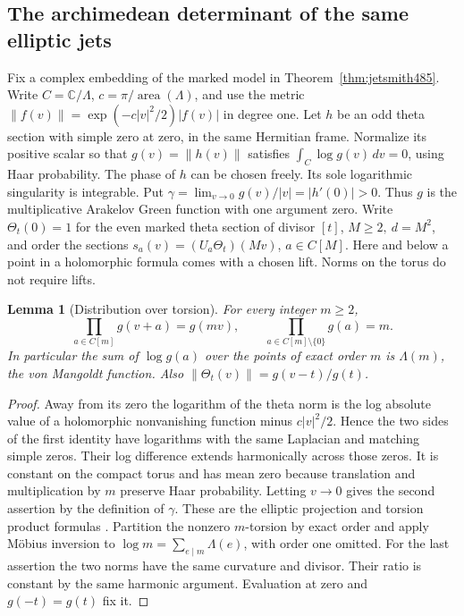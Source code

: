 \documentclass[a4paper,11pt]{article}
\newtheorem{lemma}[proposition]{Lemma}
\theoremstyle{definition}
\theoremstyle{remark}
\numberwithin{equation}{section}
\begin{document}
\subsection{The archimedean determinant of the same elliptic jets}
\label{sec:thetaalternant486}

Fix a complex embedding of the marked model in
Theorem~\ref{thm:jetsmith485}. Write \(C=\mathbb C/\Lambda\),
\(c=\pi/\operatorname{area}(\Lambda)\), and use the metric
\(\|f(v)\|=\exp(-c|v|^2/2)|f(v)|\) in degree one.
Let \(h\) be an odd theta section with simple zero at zero,
in the same Hermitian frame. Normalize its positive scalar
so that \(g(v)=\|h(v)\|\) satisfies
\(\int_C\log g(v)\,dv=0\), using Haar probability. The phase
of \(h\) can be chosen freely. Its sole logarithmic singularity
is integrable. Put
\(\gamma=\lim_{v\to0}g(v)/|v|=|h'(0)|>0\).
Thus \(g\) is the multiplicative Arakelov Green function with
one argument zero. Write \(\Theta_t(0)=1\) for the even marked
theta section of divisor \([t]\), \(M\ge2,\ d=M^2\), and order
the sections \(s_a(v)=(U_a\Theta_t)(Mv)\), \(a\in C[M]\).
Here and below a point in a holomorphic formula comes with a
chosen lift. Norms on the torus do not require lifts.

\begin{lemma}[Distribution over torsion]\leavevmode
\label{lem:green486}
For every integer \(m\ge2\),
\[
  \prod_{a\in C[m]}g(v+a)=g(mv),\qquad
  \prod_{a\in C[m]\setminus\{0\}}g(a)=m .
\]
In particular the sum of \(\log g(a)\) over the points of exact
order \(m\) is \(\Lambda(m)\), the von Mangoldt function.
Also \(\|\Theta_t(v)\|=g(v-t)/g(t)\).
\end{lemma}
\begin{proof}
Away from its zero the logarithm of the theta norm is the log
absolute value of a holomorphic nonvanishing function minus
\(c|v|^2/2\). Hence the two sides of the first identity have
logarithms with the same Laplacian and matching simple zeros.
Their log difference extends harmonically across those zeros.
It is constant on the compact torus and has mean zero because
translation and multiplication by \(m\) preserve Haar probability.
Letting \(v\to0\) gives the second assertion by the definition of
\(\gamma\). These are the elliptic projection and torsion product
formulas \cite[Thm.~3.2, Cor.~4.5]{XIII-X-dejong486}. Partition the
nonzero \(m\)-torsion by exact order and apply M\"obius inversion
to \(\log m=\sum_{e\mid m}\Lambda(e)\), with order one omitted.
For the last assertion the two norms have the same curvature
and divisor. Their ratio is constant by the same harmonic
argument. Evaluation at zero and \(g(-t)=g(t)\) fix it.
\end{proof}
\end{document}
